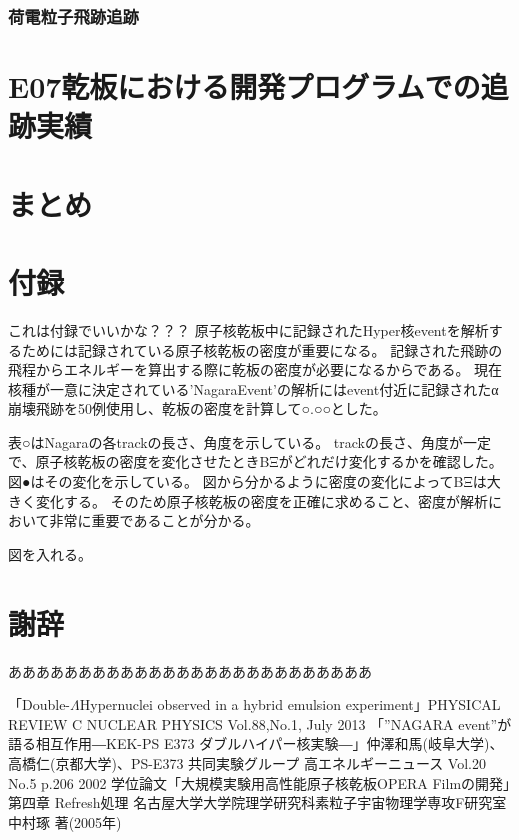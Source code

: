 \documentclass[12pt,a4paper]{jarticle}
\begin{document}
\subsubsection{荷電粒子飛跡追跡}

\newpage
\section{E07乾板における開発プログラムでの追跡実績}

\newpage
\section{まとめ}

\section*{付録}
これは付録でいいかな？？？
原子核乾板中に記録されたHyper核eventを解析するためには記録されている原子核乾板の密度が重要になる。
記録された飛跡の飛程からエネルギーを算出する際に乾板の密度が必要になるからである。
現在核種が一意に決定されている'NagaraEvent'の解析にはevent付近に記録されたα崩壊飛跡を50例使用し、乾板の密度を計算して○.○○とした。
\par
表○はNagaraの各trackの長さ、角度を示している。
trackの長さ、角度が一定で、原子核乾板の密度を変化させたときBΞがどれだけ変化するかを確認した。
図●はその変化を示している。
図から分かるように密度の変化によってBΞは大きく変化する。
そのため原子核乾板の密度を正確に求めること、密度が解析において非常に重要であることが分かる。
\par
図を入れる。
\par


\section*{謝辞}
ああああああああああああああああああああああああああ
\begin{thebibliography}{99}
 「Double-$\Lambda$Hypernuclei observed in a hybrid emulsion experiment」PHYSICAL REVIEW C NUCLEAR PHYSICS Vol.88,No.1, July 2013
 「”NAGARA event”が語る相互作用―KEK-PS E373 ダブルハイパー核実験―」仲澤和馬(岐阜大学)、高橋仁(京都大学)、PS-E373 共同実験グループ 高エネルギーニュース Vol.20 No.5 p.206 2002
 学位論文「大規模実験用高性能原子核乾板OPERA Filmの開発」第四章 Refresh処理 名古屋大学大学院理学研究科素粒子宇宙物理学専攻F研究室 中村琢 著(2005年)
\end{thebibliography}
\end{document}
